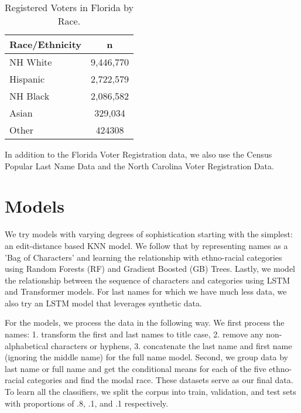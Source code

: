 \documentclass[12pt, letterpaper]{article}
\begin{document}
\begin{table}[h!]
\centering
\caption{Registered Voters in Florida by Race.}
\begin{tabular}{ l c }
\hline    
Race/Ethnicity & n \\
\hline
NH White  &       9,446,770 \\
Hispanic   &       2,722,579 \\
NH Black  &       2,086,582 \\
Asian      &       329,034 \\
Other      &       424308 \\
\hline
\end{tabular}
\label{table:fl_data}
\end{table}

In addition to the Florida Voter Registration data, we also use the Census Popular Last Name Data \citep{census2010} and the North Carolina Voter Registration Data. 

\section*{Models}
We try models with varying degrees of sophistication starting with the simplest: an edit-distance based KNN model. We follow that by representing names as a 'Bag of Characters' and learning the relationship with ethno-racial categories using Random Forests (RF) and Gradient Boosted (GB) Trees. Lastly, we model the relationship between the sequence of characters and categories using LSTM and Transformer models. For last names for which we have much less data, we also try an LSTM model that leverages synthetic data.

For the models, we process the data in the following way. We first process the names: 1. transform the first and last names to title case, 2. remove any non-alphabetical characters or hyphens, 3. concatenate the last name and first name (ignoring the middle name) for the full name model. Second, we group data by last name or full name and get the conditional means for each of the five ethno-racial categories and find the modal race. These datasets serve as our final data. To learn all the classifiers, we split the corpus into train, validation, and test sets with proportions of .8, .1, and .1 respectively.
\end{document}
